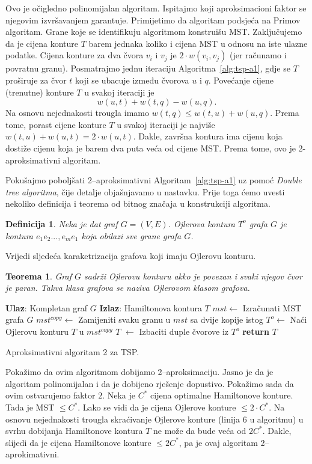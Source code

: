 \documentclass[a4paper, utf8, 11pt, colorlinks]{book}
\newtheorem{definition}{Definicija}[chapter]
\newtheorem{thm}{Teorema}[chapter]
\theoremstyle{definition}
\begin{document}
 Ovo je očigledno polinomijalan algoritam. Ispitajmo koji aproksimacioni faktor se 
njegovim izvršavanjem garantuje. Primijetimo da algoritam podsjeća na Primov algoritam. Grane koje se identifikuju algoritmom 
konstruišu MST. Zaključujemo da je cijena konture $T$ barem jednaka koliko i cijena MST u odnosu na iste ulazne podatke. Cijena konture za dva čvora $v_i$ i $v_j$ je $2 \cdot w({v_i,v_j})$ (jer računamo i povratnu granu). Posmatrajmo jednu iteraciju Algoritma~\ref{alg:tsp-a1}, gdje se $T$
proširuje za čvor $t$ koji se ubacuje između čvorova  $u$ i $q$. Povećanje cijene (trenutne) konture $T$ u svakoj iteraciji je $$w({u,t}) + w({t,q})-w({u,q}).$$
Na osnovu nejednakosti trougla imamo $ w({t,q}) \leq w({t,u}) + w({u,q})$. Prema tome, porast cijene konture $T$ u svakoj iteraciji je najviše $ w({t, u}) + w({u,t}) = 2\cdot w({u,t})$. 
Dakle, završna kontura ima cijenu koja dostiže cijenu koja je barem dva puta veća od cijene MST. Prema tome, ovo je 2-aproksimativni algoritam. 

 \noindent Pokušajmo poboljšati 2--aproksimativni Algoritam~\ref{alg:tsp-a1} uz pomoć \emph{Double tree algoritma}, čije detalje objašnjavamo u nastavku. Prije toga ćemo uvesti nekoliko definicija i teorema od bitnog značaja u konstrukciji algoritma. 
 \begin{definition}
 	  Neka je dat graf $G=(V,E)$. Ojlerova kontura $T^o$ grafa $G$ je kontura $e_1e_2...,e_me_1$ koja obilazi sve grane grafa $G$. 
 \end{definition}
Vrijedi sljedeća karaketrizacija grafova koji imaju Ojlerovu konturu. 
\begin{thm}
	 Graf $G$ sadrži Ojlerovu konturu akko je povezan i svaki njegov čvor je paran. Takva klasa grafova se naziva Ojlerovom klasom grafova.
\end{thm}

\begin{algorithm}[H] 
	\begin{algorithmic}[1]
		\STATE \textbf{Ulaz}: Kompletan graf $G$
		\STATE \textbf{Izlaz}: Hamiltonova kontura $T$   
		\STATE $mst \gets$  Izračunati MST grafa $G$
		\STATE $mst^{copy} \gets$ Zamijeniti svaku granu u $mst$ sa dvije kopije istog
		\STATE $T^o \gets$ Naći Ojlerovu konturu $T$ u $mst^{copy}$
		\STATE   $T$ $\gets$ Izbaciti duple čvorove iz $T^o$   
		\STATE \textbf{return} $T$ 
	\end{algorithmic}
   	\caption{Aproksimativni algoritam 2 za TSP.}
   	\label{alg:tsp-a2}
\end{algorithm}
  Pokažimo da ovim algoritmom dobijamo 2--aproksimaciju. Jasno je da je algoritam polinomijalan i da je dobijeno rješenje dopustivo. Pokažimo sada da ovim ostvarujemo faktor $2$.  
  Neka je $C^*$ cijena optimalne Hamiltonove konture. Tada je MST $\leq C^*$. 
  Lako se vidi da je cijena Ojlerove konture  $\leq 2 \cdot C^*$. Na osnovu nejednakosti trougla skraćivanje Ojlerove konture (linija 6 u algoritmu) u svrhu dobijanja Hamiltonove kontura $T$ ne može da bude veća od 2$C^*$. Dakle, slijedi da je cijena Hamiltonove konture $\leq 2 C^*$, pa je ovaj algoritam 2--aprokimativni.
  
\end{document}
